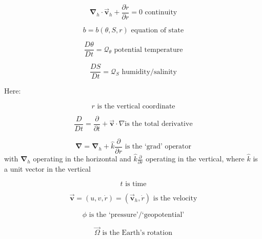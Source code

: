 \begin{equation}
\mathbf{\nabla }_{h}\cdot \vec{\mathbf{v}}_{h}+\frac{\partial \dot{r}}{
\partial r}=0\text{ continuity}  \label{eq:continuity}
\end{equation}

\begin{equation}
b=b(\theta ,S,r)\text{ equation of state} \label{eq:equation_of_state}
\end{equation}

\begin{equation}
\frac{D\theta }{Dt}=\mathcal{Q}_{\theta }\text{ potential temperature}
\label{eq:potential_temperature}
\end{equation}

\begin{equation}
\frac{DS}{Dt}=\mathcal{Q}_{S}\text{ humidity/salinity}
\label{eq:humidity_salt}
\end{equation}

Here:

\begin{equation*}
r\text{ is the vertical coordinate}
\end{equation*}

\begin{equation*}
\frac{D}{Dt}=\frac{\partial }{\partial t}+\vec{\mathbf{v}}\cdot \nabla \text{
is the total derivative}
\end{equation*}

\begin{equation*}
\mathbf{\nabla }=\mathbf{\nabla }_{h}+\widehat{k}\frac{\partial }{\partial r}
\text{ is the `grad' operator}
\end{equation*}
with $\mathbf{\nabla }_{h}$ operating in the horizontal and $\widehat{k}
\frac{\partial }{\partial r}$ operating in the vertical, where $\widehat{k}$
is a unit vector in the vertical

\begin{equation*}
t\text{ is time}
\end{equation*}

\begin{equation*}
\vec{\mathbf{v}}=(u,v,\dot{r})=(\vec{\mathbf{v}}_{h},\dot{r})\text{ is the
velocity}
\end{equation*}

\begin{equation*}
\phi \text{ is the `pressure'/`geopotential'}
\end{equation*}

\begin{equation*}
\vec{\Omega}\text{ is the Earth's rotation}
\end{equation*}


